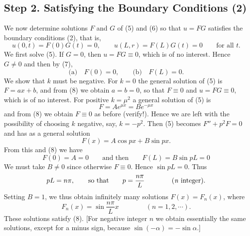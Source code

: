 \documentclass[12pt, leqno, oneside]{amsart}
\begin{document}
\subsection{Step 2. Satisfying the Boundary Conditions (2)}

We now determine solutions $F$ and $G$ of (5) and (6) so that $u=FG$ satisfies the boundary
conditions (2), that is,
\begin{equation}
    u(0,t)=F(0)G(t)=0, \qquad u(L,r)=F(L)G(t)=0 \qquad \text{for all }t.
\end{equation}
We first solve (5). If $G=0$, then $u=FG\equiv0$, which is of no interest. Hence
$G\neq0$ and then by (7),
\begin{equation}
    \text{(a)} \quad F(0)=0, \qquad \text{(b)} \quad F(L)=0.
\end{equation}
We show that $k$ must be negative. For $k=0$ the general solution of (5) is
$F=ax+b$, and from (8) we obtain $a=b=0$, so that $F\equiv0$ and $u=FG\equiv0$, which is of 
no interest. For positive $k=\mu^2$ a general solution of (5) is
\begin{equation}
  \nonumber
    F=Ae^{\mu x} = Be^{-\mu x}
\end{equation}
and from (8) we obtain $F\equiv0$ as before (verify!). Hence we are left with the possibility
of choosing $k$ negative, say, $k=-p^2$. Then (5) becomes $F''+p^2F=0$ and has as a
general solution
\begin{equation}
  \nonumber
    F(x)=A\cos{px} + B\sin{px}.
\end{equation}
From this and (8) we have
\begin{equation}
  \nonumber
    F(0)=A=0 \qquad \text{and then} \qquad F(L)=B\sin{pL}=0
\end{equation}
We must take $B\neq0$ since otherwise $F\equiv0$. Hence $\sin{pL}=0$. Thus
\begin{equation}
pL=n\pi, \qquad \text{so that} \qquad p=\frac{n\pi}{L} \qquad \qquad \text{(\emph{n}
    integer)}.
\end{equation}
Setting $B=1$, we thus obtain infinitely many solutions $F(x)=F_n(x)$, where
\begin{equation}
    F_n(x)=\sin{ \frac{n\pi}{L} x} \qquad \qquad (n=1,2,\dotsb).
\end{equation}
These solutions satisfy (8). [For negative integer $n$ we obtain essentially the same solutions,
except for a minus sign, because $\sin{(-\alpha)}=-\sin{\alpha}$.]
\end{document}
